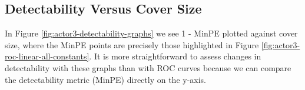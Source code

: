 \documentclass[11pt,a4paper,twoside,openright]{report}
\begin{document}
\subsection{Detectability Versus Cover Size} \label{sec:actor3-detectability-analysis}

In Figure \ref{fig:actor3-detectability-graphs} we see 1 - MinPE plotted against cover size, where the MinPE points are precisely those highlighted in Figure \ref{fig:actor3-roc-linear-all-constants}. It is more straightforward to assess changes in detectability with these graphs than with ROC curves because we can compare the detectability metric (MinPE) directly on the y-axis.

\begin{figure}[htbp]
    \centering

\end{figure}
\end{document}

